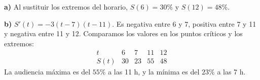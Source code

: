 \textbf{a)} Al sustituir los extremos del horario,
$S(6)=\boxed{30\%}$ y $S(12)=\boxed{48\%}$.

\textbf{b)} $S'(t)=-3(t-7)(t-11)$. Es negativa entre 6 y 7,
positiva entre 7 y 11 y negativa entre 11 y 12.
Comparamos los valores en los puntos críticos y los extremos:
\[
\begin{array}{c|rrrr}
t&6&7&11&12\\\hline
S(t)&30&23&55&48
\end{array}
\]
La audiencia máxima es del $\boxed{55\%}$ a las 11 h,
y la mínima es del $\boxed{23\%}$ a las 7 h.
